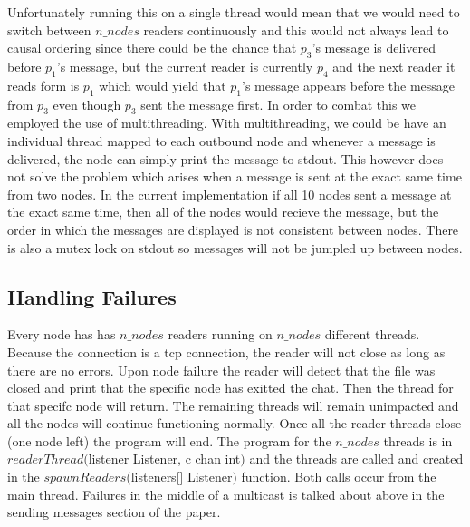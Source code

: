 \documentclass{article}
\begin{document}
				Unfortunately running this on a single thread would mean
				that we would need to switch between $n\_nodes$ readers 
				continuously and this would not always lead to causal 
				ordering since there could be the chance that 
				$p_3$'s message is delivered before $p_1$'s message, but 
				the current reader is currently $p_4$ and the next reader
				it reads form is $p_1$ which would yield that $p_1$'s message
				appears before the message from $p_3$ even though $p_3$ 
				sent the message first. In order to combat this we employed
				the use of multithreading. With multithreading, we could 
				be have an individual thread mapped to each outbound node
				and whenever a message is delivered, the node can simply
				print the message to stdout. This however does not solve
				the problem which arises when a message is sent at the exact
				same time from two nodes. In the current implementation
				if all 10 nodes sent a message at the exact same time, 
				then all of the nodes would recieve the message, but the 
				order in which the messages are displayed is not consistent
				between nodes. There is also a mutex lock on stdout so
				messages will not be jumpled up between nodes.
        \subsection{Handling Failures} 
           Every node has has $n\_nodes$ readers running on $n\_nodes$ different 
           threads. Because the connection is a tcp connection, the reader 
           will not close as long as there are no errors. Upon node failure the reader
           will detect that the file was closed and print that the specific node
           has exitted the chat. Then the thread for that specifc node will 
           return. The remaining threads will remain unimpacted and all the nodes 
           will continue functioning normally. Once all the reader threads close 
           (one node left) the program will end. The program for the $n\_nodes$ 
           threads is in $readerThread($listener Listener, c chan int$)$ and the 
           threads are called and created in the $spawnReaders($listeners[] 
           Listener$)$ function. Both calls occur from the main thread. Failures in 
					the middle of a multicast is talked about above in the sending messages
					section of the paper. 
\end{document}
